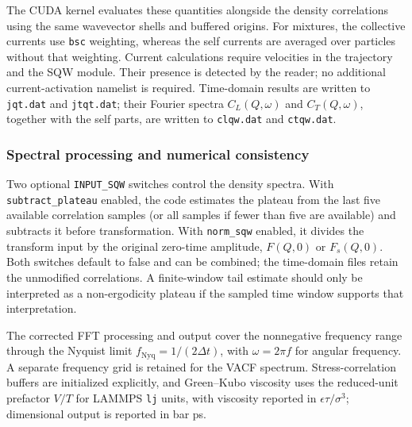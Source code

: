\documentclass[final,1p,times]{elsarticle}
\begin{document}
The CUDA kernel evaluates these quantities alongside the density
correlations using the same wavevector shells and buffered origins.
For mixtures, the collective currents use \texttt{bsc} weighting,
whereas the self currents are averaged over particles without that
weighting. Current calculations require velocities in the trajectory
and the SQW module. Their presence is detected by the reader; no
additional current-activation namelist is required. Time-domain
results are written to \texttt{jqt.dat} and \texttt{jtqt.dat}; their
Fourier spectra $C_L(Q,\omega)$ and $C_T(Q,\omega)$, together with
the self parts, are written to \texttt{clqw.dat} and
\texttt{ctqw.dat}.

\subsubsection{Spectral processing and numerical consistency}
Two optional \texttt{INPUT\_SQW} switches control the density spectra.
With \texttt{subtract\_plateau} enabled, the code estimates the plateau
from the last five available correlation samples (or all samples if
fewer than five are available) and subtracts it before transformation.
With \texttt{norm\_sqw} enabled, it divides the transform input by the
original zero-time amplitude, $F(Q,0)$ or $F_s(Q,0)$. Both switches
default to false and can be combined; the time-domain files retain
the unmodified correlations. A finite-window tail estimate should
only be interpreted as a non-ergodicity plateau if the sampled time
window supports that interpretation.

The corrected FFT processing and output cover the nonnegative
frequency range through the Nyquist limit
$f_{\mathrm{Nyq}}=1/(2\Delta t)$, with $\omega=2\pi f$ for angular
frequency. A separate frequency grid is retained for the VACF
spectrum. Stress-correlation buffers are initialized explicitly, and
Green--Kubo viscosity uses the reduced-unit prefactor $V/T$ for
LAMMPS \texttt{lj} units, with viscosity reported in
$\epsilon\tau/\sigma^3$; dimensional output is reported in bar ps.
\end{document}

